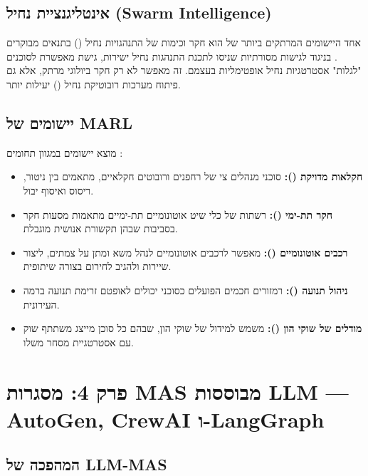 \documentclass[12pt,a4paper]{article}
\begin{document}
\subsection{אינטליגנציית נחיל (Swarm Intelligence)}

אחד היישומים המרתקים ביותר של  הוא חקר וכימות של התנהגויות נחיל () בתנאים מבוקרים \cite{Phan_Emergence}. בניגוד לגישות מסורתיות שניסו לתכנת התנהגות נחיל ישירות, גישת  מאפשרת לסוכנים "לגלות" אסטרטגיות נחיל אופטימליות בעצמם. זה מאפשר לא רק חקר ביולוגי מרתק, אלא גם פיתוח מערכות רובוטיקת נחיל () יעילות יותר.

\subsection{יישומים של MARL}

 מוצא יישומים במגוון תחומים \cite{ScienceDirect_MARL2024}:

\begin{itemize}
  \item \textbf{חקלאות מדויקת ():} סוכני  מנהלים צי של רחפנים ורובוטים חקלאיים, מתאמים בין ניטור, ריסוס ואיסוף יבול.
  \item \textbf{חקר תת-ימי ():} רשתות של כלי שיט אוטונומיים תת-ימיים מתאמות מסעות חקר בסביבות שבהן תקשורת אנושית מוגבלת.
  \item \textbf{רכבים אוטונומיים ():}  מאפשר לרכבים אוטונומיים לנהל משא ומתן על צמתים, ליצור שיירות ולהגיב לחירום בצורה שיתופית.
  \item \textbf{ניהול תנועה ():} רמזורים חכמים הפועלים כסוכני  יכולים לאופטם זרימת תנועה ברמה העירונית.
  \item \textbf{מודלים של שוקי הון ():}  משמש למידול של שוקי הון, שבהם כל סוכן מייצג משתתף שוק עם אסטרטגיית מסחר משלו.
\end{itemize}

\newpage

\section{פרק 4: מסגרות MAS מבוססות LLM — AutoGen, CrewAI ו-LangGraph}

\subsection{המהפכה של LLM-MAS}
\end{document}

